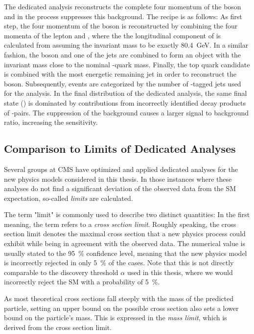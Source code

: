 The dedicated analysis reconstructs the complete four momentum of the \PWprime boson and in the process suppresses this background. The recipe is as follows: As first step, the four momentum of the \PW boson is reconstructed by combining the four momenta of the lepton and \MET, where the the longitudinal component of \METvec is calculated from assuming the \PW invariant mass to be exactly \SI{80.4}{\GeV}. In a similar fashion, the \PW boson and one of the jets are combined to form an object with the invariant mass close to the nominal \Pqt-quark mass. Finally, the top quark candidate is combined with the most energetic remaining jet in order to reconstruct the \PWprime boson. 
Subsequently, events are categorized by the number of \Pqb-tagged jets used for the analysis. 
In the final distribution of the dedicated analysis, the same final state () is dominated by contributions from incorrectly identified decay products of \Pqt \APqt-pairs. The suppression of the \PW background causes a larger signal to background ratio, increasing the sensitivity.


\subsection{Comparison to Limits of Dedicated Analyses}
Several groups at \ac{CMS} have optimized and applied dedicated analyses for the new physics models considered in this thesis. In those instances where these analyses do not find a significant deviation of the observed data from the \ac{SM} expectation, so-called \emph{limits} are calculated.

The term "limit" is commonly used to describe two distinct quantities: In the first meaning, the term refers to a \emph{cross section limit}. Roughly speaking, the cross section limit denotes the maximal cross section that a new physics process could exhibit while being in agreement with the observed data. The numerical value is usually stated to the \SI{95}{\percent} confidence level, meaning that the new physics model is incorrectly rejected in only \SI{5}{\percent} of the cases. Note that this is not directly comparable to the discovery threshold $\alpha$ used in this thesis, where we would incorrectly reject the \acl{SM} with a probability of \SI{5}{\percent}.

As most theoretical cross sections fall steeply with the mass of the predicted particle, setting an upper bound on the possible cross section also sets a lower bound on the particle's mass. This is expressed in the \emph{mass limit}, which is derived from the cross section limit.

